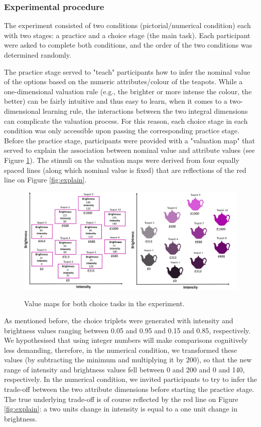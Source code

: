 \documentclass[11pt,a4paper]{article}
\begin{document}
\subsubsection{Experimental procedure}

The experiment consisted of two conditions (pictorial/numerical condition) each with two stages: a practice and a choice stage (the main task).  Each participant were asked to complete both conditions, and the order of the two conditions was determined randomly. 


The practice stage served to "teach" participants how to infer the nominal value of the options based on the numeric attributes/colour of the teapots. While a one-dimensional valuation rule (e.g., the brighter or more intense the colour, the better) can be fairly intuitive and thus easy to learn, when it comes to a two-dimensional learning rule, the interactions between the two integral dimensions can complicate the valuation process. For this reason, each choice stage in each condition was only accessible upon passing the corresponding practice stage. Before the practice stage, participants  were provided with a "valuation map" that served to explain the association between nominal value and attribute values (see Figure \ref{fig:valuemaps}). The stimuli on the valuation maps were derived from four equally spaced lines (along which nominal value is fixed) that are reflections of the red line on Figure \ref{fig:explain}.


\begin{figure}[htp]
\centering
\caption{Value maps for both choice tasks in the experiment.}
\includegraphics[width=1\textwidth]{value_maps.png}
\label{fig:valuemaps}
\end{figure}

As mentioned before, the choice triplets were generated with intensity and brightness values ranging between 0.05 and 0.95 and 0.15 and 0.85, respectively.  We hypothesised that using integer numbers will make comparisons cognitively less demanding, therefore, in the numerical condition, we transformed these values (by subtracting the minimum and multiplying it by 200), so that the new range of intensity and brightness values fell between 0 and 200 and 0 and 140, respectively. In the numerical condition, we invited participants to try to infer the trade-off between the two attribute dimensions before starting the practice stage. The true underlying trade-off is of course reflected by the red line on Figure \ref{fig:explain}: a two units change in intensity is equal to a one unit change in brightness.
\end{document}
